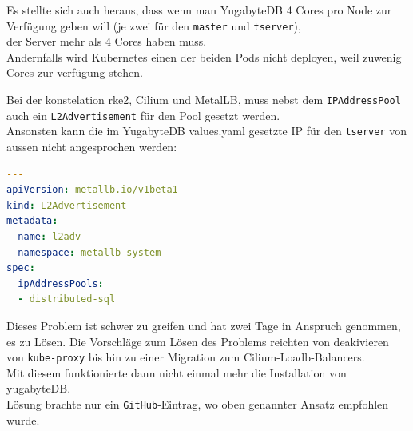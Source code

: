 \begin{flushleft}
    Es stellte sich auch heraus, dass wenn man YugabyteDB 4 Cores pro Node zur Verfügung geben will (je zwei für den \texttt{master} und \texttt{tserver}),\\
    der Server mehr als 4 Cores haben muss.\\
    Andernfalls wird Kubernetes einen der beiden Pods nicht deployen, weil zuwenig Cores zur verfügung stehen.
\end{flushleft}
\begin{flushleft}
    Bei der konstelation \gls{rke2}, \Gls{Cilium} und \Gls{MetalLB}, muss nebst dem \texttt{IPAddressPool} auch ein \texttt{L2Advertisement} für den Pool gesetzt werden.\\
    Ansonsten kann die im YugabyteDB values.yaml gesetzte IP für den \texttt{tserver} von aussen nicht angesprochen werden:
    \lstset{style=gra_codestyle}
    \begin{lstlisting}[language=yaml, caption=metallb - Konfig YAML - Detail L2Advertisement,captionpos=b,label={lst:metallb-l2advertisement-setting},breaklines=true]
---
apiVersion: metallb.io/v1beta1
kind: L2Advertisement
metadata:
  name: l2adv
  namespace: metallb-system
spec:
  ipAddressPools:
  - distributed-sql
    \end{lstlisting}
    Dieses Problem ist schwer zu greifen und hat zwei Tage in Anspruch genommen, es zu Lösen.
    Die Vorschläge zum Lösen des Problems reichten von deakivieren von \texttt{kube-proxy} bis hin zu einer Migration zum \Gls{Cilium}-Loadb-Balancers.\\
    Mit diesem funktionierte dann nicht einmal mehr die Installation von yugabyteDB.\\
    Lösung brachte nur ein \texttt{GitHub}-Eintrag\cite{D4IZIEFN}, wo oben genannter Ansatz empfohlen wurde.
\end{flushleft}
